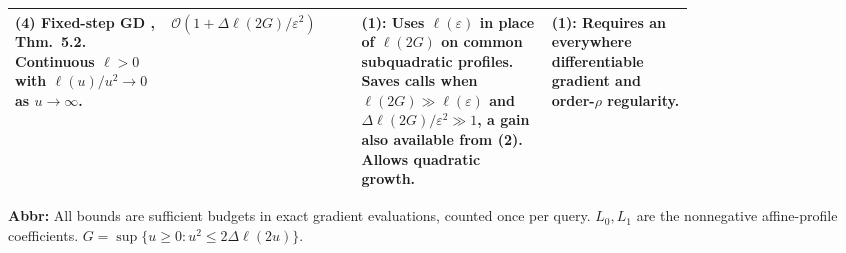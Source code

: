 \begin{table}[tp]
\begin{threeparttable}
\begin{tabularx}{\linewidth}{@{}>{\raggedright\arraybackslash}p{0.23\linewidth}>{\raggedright\arraybackslash}p{0.28\linewidth}>{\raggedright\arraybackslash}p{0.28\linewidth}>{\raggedright\arraybackslash}X@{}}
\midrule
\textbf{(4)} Fixed-step GD \citep{ellncLi2023v2}, Thm.~5.2. Continuous $\ell>0$ with $\ell(u)/u^2\to0$ as $u\to\infty$. & $\mathcal{O}(1+\Delta\ell(2G)/\varepsilon^2)$ & \textbf{(1)}: Uses $\ell(\varepsilon)$ in place of $\ell(2G)$ on common subquadratic profiles. Saves calls when $\ell(2G)\gg\ell(\varepsilon)$ and $\Delta\ell(2G)/\varepsilon^2\gg1$, a gain also available from \textbf{(2)}. Allows quadratic growth. & \textbf{(1)}: Requires an everywhere differentiable gradient and order-$\rho$ regularity. \\
\bottomrule
\end{tabularx}
\begin{tablenotes}[flushleft]\footnotesize
\item[] \textbf{Abbr:} All bounds are sufficient budgets in exact gradient evaluations, counted once per query. $L_0,L_1$ are the nonnegative affine-profile coefficients. $G=\sup\{u\ge0:u^2\le 2\Delta\ell(2u)\}$.
\end{tablenotes}
\end{threeparttable}
\end{table}

